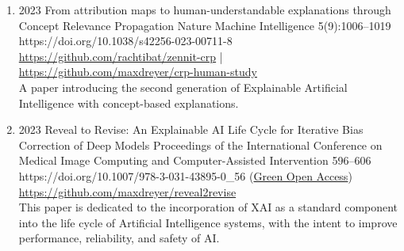         \begin{enumerate}
            \item
                            {2023}
                            {From attribution maps to human-understandable explanations through Concept Relevance Propagation}
                            {Nature Machine Intelligence}
                            {5(9):1006--1019}
                            {https://doi.org/10.1038/s42256-023-00711-8}
                            {   \\
                                \href{https://github.com/rachtibat/zennit-crp}{https://github.com/rachtibat/zennit-crp} |
                                \href{https://github.com/maxdreyer/crp-human-study}{https://github.com/maxdreyer/crp-human-study}\\
                                A paper introducing the second generation of Explainable Artificial Intelligence with concept-based explanations.
                            }



            \item {}
                            {2023}
                            {Reveal to Revise: An Explainable AI Life Cycle for Iterative Bias Correction of Deep Models}
                            {Proceedings of the International Conference on Medical Image Computing and Computer-Assisted Intervention}
                            {596--606}
                            {https://doi.org/10.1007/978-3-031-43895-0_56}
                            {(\href{https://arxiv.org/abs/2303.12641}{Green Open Access})\\ \href{https://github.com/maxdreyer/reveal2revise}{https://github.com/maxdreyer/reveal2revise}\\
                            This paper is dedicated to the incorporation of XAI as a standard component into the life cycle of Artificial Intelligence systems, with the intent to improve performance, reliability, and safety of AI.}



\end{enumerate}
